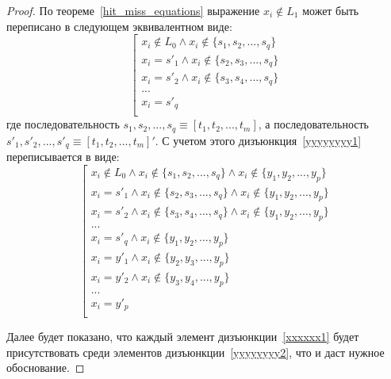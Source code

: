 \begin{proof}
  По теореме~\ref{hit_miss_equations} выражение $x_i \notin L_1$ может
  быть переписано в следующем эквивалентном виде:
  $$
  \left[ \begin{array}{l}
  x_i \notin L_0 \wedge x_i \notin \{s_1, s_2, ..., s_q\}\\
  x_i = s'_1 \wedge x_i \notin \{s_2, s_3, ..., s_q\}\\
  x_i = s'_2 \wedge x_i \notin \{s_3, s_4, ..., s_q\}\\
  ...\\
  x_i = s'_q\\
  \end{array} \right.
  $$
  где последовательность $s_1, s_2, ..., s_q \equiv [t_1, t_2, ...,
  t_m]$, а последовательность\\ $s'_1, s'_2, ..., s'_q \equiv [t_1, t_2,
  ..., t_m]'$. С учетом этого дизъюнкция~\ref{yyyyyyyy1}
  переписывается в виде:
  \begin{equation}\label{yyyyyyyy2}
  \left[ \begin{array}{l}
    x_i \notin L_0 \wedge x_i \notin \{s_1, s_2, ..., s_q\}\wedge x_i \notin \{y_1, y_2, ..., y_p\}\\
    x_i = s'_1 \wedge x_i \notin \{s_2, s_3, ..., s_q\}\wedge x_i \notin \{y_1, y_2, ..., y_p\}\\
    x_i = s'_2 \wedge x_i \notin \{s_3, s_4, ..., s_q\}\wedge x_i \notin \{y_1, y_2, ..., y_p\}\\
    ...\\
    x_i = s'_q \wedge x_i \notin \{y_1, y_2, ..., y_p\}\\
    x_i = y'_1 \wedge x_i \notin \{y_2, y_3, ..., y_p\}\\
    x_i = y'_2 \wedge x_i \notin \{y_3, y_4, ..., y_p\}\\
    ...\\
    x_i = y'_p\\
  \end{array}\right.\end{equation}

  Далее будет показано, что каждый элемент дизъюнкции~\ref{xxxxxx1}
  будет присутствовать среди элементов дизъюнкции~\ref{yyyyyyyy2},
  что и даст нужное обоснование.


\end{proof}
